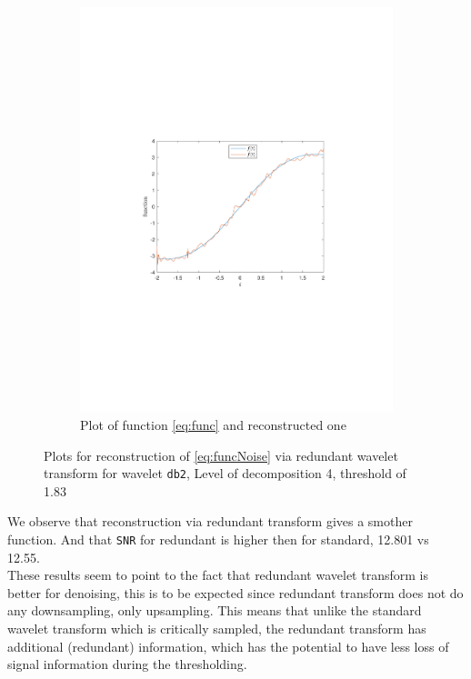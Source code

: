 \documentclass[a4paper]{article}
\begin{document}
\begin{figure}[H]
\begin{subfigure}{0.49\textwidth}
		\includegraphics[trim={3.5cm 8cm 4cm 8cm},clip,width=1\textwidth]{Images/FuncRecRed.pdf}
		\caption{Plot of function \cref{eq:func} and reconstructed one}
		\label{sub:FuncRecRed}
	\end{subfigure}
	\caption{Plots for reconstruction of \cref{eq:funcNoise} via redundant wavelet transform for wavelet \texttt{db2}, Level of decomposition 4, threshold of 1.83}
	\label{fig:FuncRecRed}
\end{figure}

	We observe that reconstruction via redundant transform gives a smother function. And that \texttt{SNR} for redundant is higher then for standard, 12.801 vs 12.55. \\
	These results seem to point to the fact that redundant wavelet transform is better for denoising, this is to be expected since redundant transform does not do any downsampling, only upsampling.
	This means that unlike the standard wavelet transform which is critically sampled, the redundant transform has additional (redundant) information, which has the potential to have less loss of signal information during the thresholding.
\end{document}
